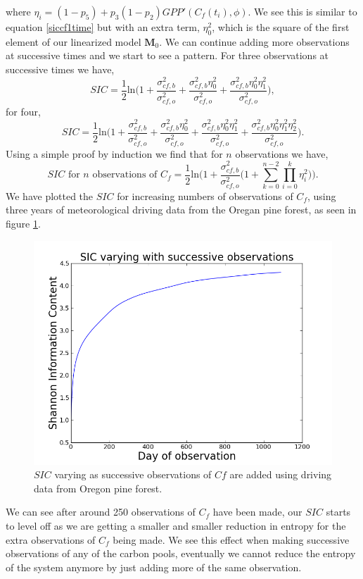 \documentclass[11pt]{article}
\begin{document}
where $\eta_i=(1-p_5)+p_3(1-p_2)GPP'(C_f(t_i),\phi)$. We see this is similar to equation \ref{siccf1time} but with an extra term, $\eta_0^2$, which is the square of the first element of our linearized model $\mathbf{M}_0$. We can continue adding more observations at successive times and we start to see a pattern. For three observations at successive times we have,
\begin{equation}
SIC =\frac{1}{2}\text{ln} \bigg(1+\frac{\sigma_{cf,b}^{2}}{\sigma_{cf,o}^{2}}+\frac{\sigma_{cf,b}^{2}\eta_0^{2}}{\sigma_{cf,o}^{2}}+\frac{\sigma_{cf,b}^{2}\eta_0^{2}\eta_1^{2}}{\sigma_{cf,o}^{2}} \bigg),
\end{equation}
for four,
\begin{equation}
SIC =\frac{1}{2}\text{ln} \bigg(1+\frac{\sigma_{cf,b}^{2}}{\sigma_{cf,o}^{2}}+\frac{\sigma_{cf,b}^{2}\eta_0^{2}}{\sigma_{cf,o}^{2}}+\frac{\sigma_{cf,b}^{2}\eta_0^{2}\eta_1^{2}}{\sigma_{cf,o}^{2}}+\frac{\sigma_{cf,b}^{2}\eta_0^{2}\eta_1^{2}\eta_2^{2}}{\sigma_{cf,o}^{2}} \bigg).
\end{equation}
Using a simple proof by induction we find that for $n$ observations we have,
\begin{equation}
SIC\text{ for }n\text{ observations of }C_f = \frac{1}{2}\text{ln}\bigg(1+\frac{\sigma_{cf,b}^{2}}{\sigma_{cf,o}^{2}}\big(1+\sum_{k=0}^{n-2}\prod_{i=0}^{k}\eta_i^{2}\big)\bigg).
\end{equation}
We have plotted the $SIC$ for increasing numbers of observations of $C_f$, using three years of meteorological driving data from the Oregan pine forest, as seen in figure \ref{Cf_succ}.

\begin{figure}[h]
\centering
\includegraphics[height=.34\textwidth]{SIC0_1090cf.png}
\caption{$SIC$ varying as successive observations of $Cf$ are added using driving data from Oregon pine forest.}
\label{Cf_succ}
\end{figure}

We can see after around 250 observations of $C_f$ have been made, our $SIC$ starts to level off as we are getting a smaller and smaller reduction in entropy for the extra observations of $C_f$ being made. We see this effect when making successive observations of any of the carbon pools, eventually we cannot reduce the entropy of the system anymore by just adding more of the same observation.  
\end{document}
